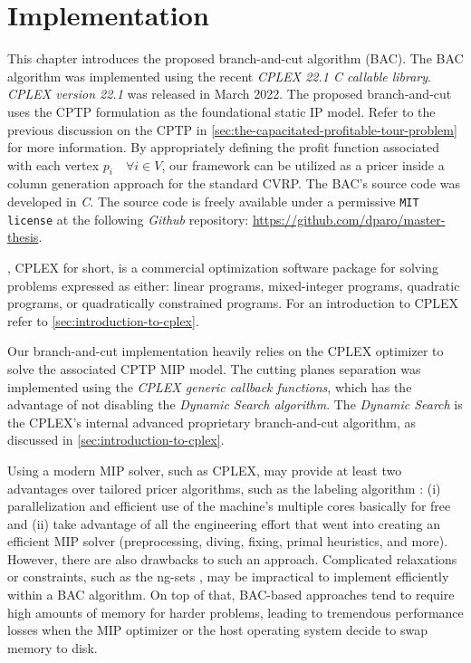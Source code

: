 \chapter{Implementation}
\label{sec:implementation-chapter}

This chapter introduces the proposed branch-and-cut algorithm (BAC).
The BAC algorithm was implemented using the recent \textit{CPLEX 22.1 C callable library}.
\textit{CPLEX version 22.1} was released in March 2022.
The proposed branch-and-cut uses the CPTP formulation as the foundational static IP model.
Refer to the previous discussion on the CPTP in \cref{sec:the-capacitated-profitable-tour-problem} for more information.
By appropriately defining the profit function associated with each vertex $p_i \quad \forall i \in V$,
our framework can be utilized as a pricer inside a column generation approach for the standard CVRP.
The BAC's source code was developed in \textit{C}.
The source code is freely available under a permissive \texttt{MIT license}
at the following \textit{Github} repository: \url{https://github.com/dparo/master-thesis}.

\medskip

,
CPLEX for short,
is a commercial optimization software package for solving problems expressed as either:
linear programs, mixed-integer programs, quadratic programs, or quadratically constrained programs.
For an introduction to CPLEX refer to \cref{sec:introduction-to-cplex}.

Our branch-and-cut implementation heavily relies on the CPLEX optimizer to solve
the associated CPTP MIP model.
The cutting planes separation was implemented using the \textit{CPLEX generic callback functions},
which has the advantage of not disabling the \textit{Dynamic Search algorithm}.
The \textit{Dynamic Search} is the CPLEX's internal advanced proprietary branch-and-cut algorithm,
as discussed in \cref{sec:introduction-to-cplex}.

Using a modern MIP solver, such as CPLEX, may provide at least two advantages
over tailored pricer algorithms, such as the labeling algorithm \parencite{desrochers1992, feillet2004}:
(i) parallelization and efficient use of the machine's multiple cores basically for free
and (ii) take advantage of all the engineering effort that went into creating an efficient MIP solver
(preprocessing, diving, fixing, primal heuristics, and more).
However, there are also drawbacks to such an approach.
Complicated relaxations or constraints, such as the ng-sets \parencite{baldacci2011},
may be impractical to implement efficiently within a BAC algorithm.
On top of that,
BAC-based approaches tend to require high amounts of memory for harder problems,
leading to tremendous performance losses
when the MIP optimizer or the host operating system decide to swap memory to disk.

